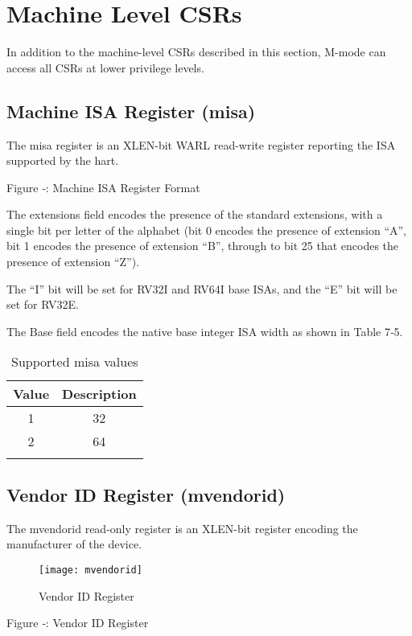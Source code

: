 \section{Machine Level CSRs}\label{machine-level-csrs}

In addition to the machine-level CSRs described in this section, M-mode
can access all CSRs at lower privilege levels.

\subsection{Machine ISA Register
(misa)}\label{machine-isa-register-misa}

The misa register is an XLEN-bit WARL read-write register reporting the
ISA supported by the hart.

\missingfigure{}


Figure ‑: Machine ISA Register Format

The extensions field encodes the presence of the standard extensions,
with a single bit per letter of the alphabet (bit 0 encodes the presence
of extension ``A'', bit 1 encodes the presence of extension ``B'',
through to bit 25 that encodes the presence of extension ``Z'').

The ``I'' bit will be set for RV32I and RV64I base ISAs, and the ``E''
bit will be set for RV32E.

The Base field encodes the native base integer ISA width as shown in
Table 7‑5.

\begin{longtable}[]{@{}cc@{}}
\toprule
Value & Description\tabularnewline
\midrule
\endhead
1 & 32\tabularnewline
2 & 64\tabularnewline
\bottomrule
\caption{Supported misa values}
\label{tab:misa-values}
\end{longtable}

\subsection{Vendor ID Register
(mvendorid)}\label{vendor-id-register-mvendorid}

The mvendorid read-only register is an XLEN-bit register encoding the
manufacturer of the device.

\begin{figure}[hbt]
  \texttt{[image: mvendorid]}
  \caption{Vendor ID Register}
\end{figure}


Figure ‑: Vendor ID Register

